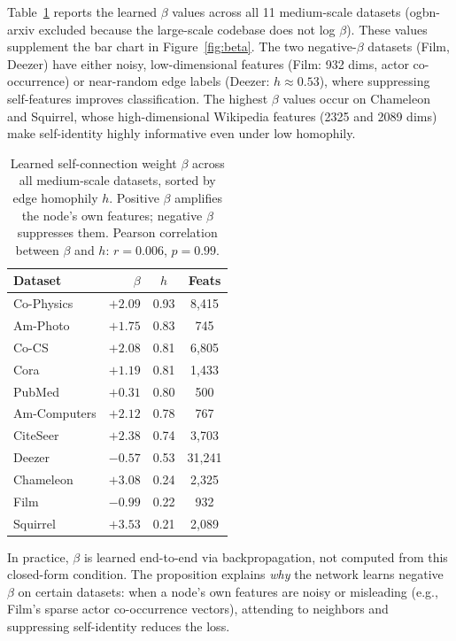 Table~\ref{tab:beta_values} reports the learned $\beta$ values across all 11 medium-scale datasets (ogbn-arxiv excluded because the large-scale codebase does not log $\beta$).  These values supplement the bar chart in Figure~\ref{fig:beta}.  The two negative-$\beta$ datasets (Film, Deezer) have either noisy, low-dimensional features (Film: 932 dims, actor co-occurrence) or near-random edge labels (Deezer: $h \approx 0.53$), where suppressing self-features improves classification.  The highest $\beta$ values occur on Chameleon and Squirrel, whose high-dimensional Wikipedia features (2325 and 2089 dims) make self-identity highly informative even under low homophily.

\begin{table}[t]
\centering
\small
\begin{tabular}{l|rcc}
\toprule
\textbf{Dataset} & $\beta$ & $h$ & \textbf{Feats} \\
\midrule
Co-Physics   & $+2.09$ & 0.93 & 8,415 \\
Am-Photo     & $+1.75$ & 0.83 & 745 \\
Co-CS        & $+2.08$ & 0.81 & 6,805 \\
Cora         & $+1.19$ & 0.81 & 1,433 \\
PubMed       & $+0.31$ & 0.80 & 500 \\
Am-Computers & $+2.12$ & 0.78 & 767 \\
CiteSeer     & $+2.38$ & 0.74 & 3,703 \\
\midrule
Deezer       & $-0.57$ & 0.53 & 31,241 \\
Chameleon    & $+3.08$ & 0.24 & 2,325 \\
Film         & $-0.99$ & 0.22 & 932 \\
Squirrel     & $+3.53$ & 0.21 & 2,089 \\
\bottomrule
\end{tabular}
\caption{Learned self-connection weight $\beta$ across all medium-scale datasets, sorted by edge homophily $h$.  Positive $\beta$ amplifies the node's own features; negative $\beta$ suppresses them.  Pearson correlation between $\beta$ and $h$: $r = 0.006$, $p = 0.99$.}
\label{tab:beta_values}
\end{table}

\begin{remark}
In practice, $\beta$ is learned end-to-end via backpropagation, not computed from this closed-form condition. The proposition explains \emph{why} the network learns negative $\beta$ on certain datasets: when a node's own features are noisy or misleading (e.g., Film's sparse actor co-occurrence vectors), attending to neighbors and suppressing self-identity reduces the loss.
\end{remark}


